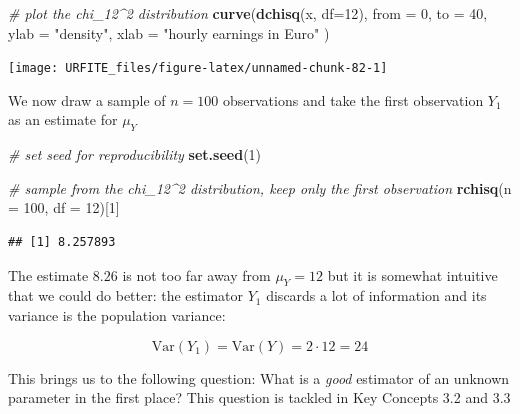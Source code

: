 \documentclass[]{book}
\newenvironment{Shaded}{\begin{snugshade}}{\end{snugshade}}
\newcommand{\KeywordTok}[1]{\textcolor[rgb]{0.13,0.29,0.53}{\textbf{#1}}}
\newcommand{\DataTypeTok}[1]{\textcolor[rgb]{0.13,0.29,0.53}{#1}}
\newcommand{\DecValTok}[1]{\textcolor[rgb]{0.00,0.00,0.81}{#1}}
\newcommand{\StringTok}[1]{\textcolor[rgb]{0.31,0.60,0.02}{#1}}
\newcommand{\CommentTok}[1]{\textcolor[rgb]{0.56,0.35,0.01}{\textit{#1}}}
\newcommand{\NormalTok}[1]{#1}
\theoremstyle{definition}
\theoremstyle{definition}
\theoremstyle{definition}
\theoremstyle{remark}
\begin{document}
\begin{Shaded}
\begin{Highlighting}[]
\CommentTok{# plot the chi_12^2 distribution}
\KeywordTok{curve}\NormalTok{(}\KeywordTok{dchisq}\NormalTok{(x, }\DataTypeTok{df=}\DecValTok{12}\NormalTok{), }
      \DataTypeTok{from =} \DecValTok{0}\NormalTok{, }
      \DataTypeTok{to =} \DecValTok{40}\NormalTok{, }
      \DataTypeTok{ylab =} \StringTok{"density"}\NormalTok{, }
      \DataTypeTok{xlab =} \StringTok{"hourly earnings in Euro"}
\NormalTok{      )}
\end{Highlighting}
\end{Shaded}

\begin{center}\texttt{[image: URFITE\_files/figure-latex/unnamed-chunk-82-1]} \end{center}

We now draw a sample of \(n=100\) observations and take the first
observation \(Y_1\) as an estimate for \(\mu_Y\)

\begin{Shaded}
\begin{Highlighting}[]
\CommentTok{# set seed for reproducibility}
\KeywordTok{set.seed}\NormalTok{(}\DecValTok{1}\NormalTok{)}

\CommentTok{# sample from the chi_12^2 distribution, keep only the first observation}
\KeywordTok{rchisq}\NormalTok{(}\DataTypeTok{n =} \DecValTok{100}\NormalTok{, }\DataTypeTok{df =} \DecValTok{12}\NormalTok{)[}\DecValTok{1}\NormalTok{]}
\end{Highlighting}
\end{Shaded}

\begin{verbatim}
## [1] 8.257893
\end{verbatim}

The estimate \(8.26\) is not too far away from \(\mu_Y = 12\) but it is
somewhat intuitive that we could do better: the estimator \(Y_1\)
discards a lot of information and its variance is the population
variance:

\[ \text{Var}(Y_1) = \text{Var}(Y) = 2 \cdot 12 = 24 \]

This brings us to the following question: What is a \emph{good}
estimator of an unknown parameter in the first place? This question is
tackled in Key Concepts 3.2 and 3.3
\end{document}
